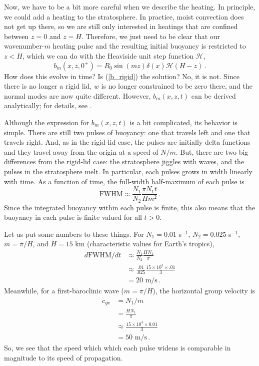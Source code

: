 \documentclass[12pt]{article}
\begin{document}
Now, we have to be a bit more careful when we describe the heating.  In principle, we could add a heating to the stratosphere.  In practice, moist convection does not get up there, so we are still only interested in heatings that are confined between $z=0$ and $z=H$.  Therefore, we just need to be clear that our wavenumber-$m$ heating pulse and the resulting initial buoyancy is restricted to $z<H$, which we can do with the Heaviside unit step function $\mathcal{H}$,
\begin{equation}
b_m(x,z,0^+) = B_0 \sin(mz) \delta(x) \mathcal{H}(H-z) \, . \label{b_initial_leaky}
\end{equation}
How does this evolve in time?  Is (\ref{b_rigid}) the solution?  No, it is not.  Since there is no longer a rigid lid, $w$ is no longer constrained to be zero there, and the normal modes are now quite different.  However, $b_m(x,z,t)$ can be derived analytically; for details, see \citet{15leaky}.


Although the expression for $b_m(x,z,t)$ is a bit complicated, its behavior is simple.  There are still two pulses of buoyancy: one that travels left and one that travels right.  And, as in the rigid-lid case, the pulses are initially delta functions and they travel away from the origin at a speed of $N/m$.  But, there are two big differences from the rigid-lid case: the stratosphere jiggles with waves, and the pulses in the stratosphere melt.  In particular, each pulses grows in width linearly with time.  As a function of time, the full-width half-maximum of each pulse is
\[
\text{FWHM} \approx \frac{N_1}{N_2} \frac{\pi N_1 t}{H m^2} \, .
\]
Since the integrated buoyancy within each pulse is finite, this also means that the buoyancy in each pulse is finite valued for all $t>0$.


Let us put some numbers to these things.  For $N_1 = 0.01$ s$^{-1}$, $N_2 = 0.025$ s$^{-1}$, $m = \pi/H$, and $H = 15$ km (characteristic values for Earth's tropics),
\begin{align}
d\text{FWHM}/dt &\approx \frac{N_1}{N_2} \frac{H N_1}{\pi} \\
&\approx \frac{.01}{.025} \frac{15 \times 10^3 \times .01}{3} \\
&= 20 \text{ m/s} \, .
\end{align}
Meanwhile, for a first-baroclinic wave ($m = \pi/H$), the horizontal group velocity is
\begin{align}
c_{gx} &= N_1/m \\
&= \frac{H N_1}{\pi} \\
&\approx \frac{15 \times 10^3 \times 0.01}{3} \\
&= 50 \text{ m/s} \, .
\end{align}
So, we see that the speed which which each pulse widens is comparable in magnitude to its speed of propagation.
\end{document}
